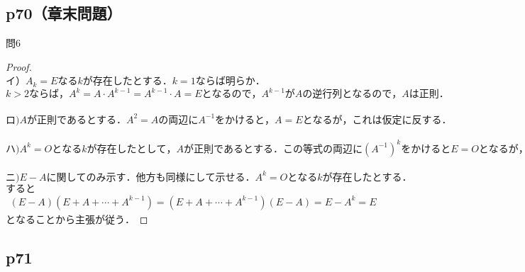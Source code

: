 \documentclass[dvipdfmx,uplatex,11pt]{jsarticle}
\theoremstyle{definition}
\begin{document}
\subsection{p70（章末問題）}
問6\\
\noindent
\begin{leftbar}
\begin{proof}
~\\
イ）$A_k=Eなるkが存在したとする．k = 1 ならば明らか．$\\
$k>2ならば，A^k=A·A^{k-1}=A^{k-1}· A = E となるので，A^{k-1}がAの逆行列となるので，Aは正則．$\\
\\
$ロ)Aが正則であるとする．A^2=Aの両辺にA^{-1}をかけると，A=Eとなるが，これは仮定に反する．$\\
\\
$ハ)A^k=Oとなる k が存在したとして，A が正則であるとする．この等式の両辺に (A^{−1})^kをかけるとE=Oとなるが，これは明らかに矛盾．$\\
\\
$ニ)E−A に関してのみ示す．他方も同様にして示せる．A^{k}=Oとなるkが存在したとする．$\\
$すると$
\begin{eqnarray*}
(E − A)(E+A+ \cdots +A^{k−1})=(E+A+ \cdots + A^{k−1})(E−A)=E−A^k=E
\end{eqnarray*}
$となることから主張が従う．$
\end{proof}
\end{leftbar}
%
\newpage
%
%
%
\setcounter{equation}{0}
\subsection{p71}
%
%
%
\end{document}
